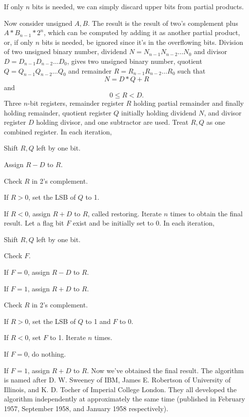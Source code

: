 \documentclass[a4paper,12pt]{report}
\begin{document}
If only $n$ bits is needed, we can simply discard upper bits from partial products.

Now consider unsigned $A,B$. The result is the result of two's complement plus $A*B_{n-1}*2^n$, which can be computed by adding it as another partial product, or, if only $n$ bits is needed, be ignored since it's in the overflowing bits.
Division of two unsigned binary number, dividend $N=N_{n-1}N_{n-2}\ldots N_0$ and divisor $D=D_{n-1}D_{n-2}\ldots D_0$, gives two unsigned binary number, quotient $Q=Q_{n-1}Q_{n-2}\ldots Q_0$ and remainder $R=R_{n-1}R_{n-2}\ldots R_0$ such that
\[N=D*Q+R\]
and
\[0\le R<D.\]
Three $n$-bit registers, remainder register $R$ holding partial remainder and finally holding remainder, quotient register $Q$ initially holding dividend $N$, and divisor register $D$ holding divisor, and one subtractor are used. Treat ${R,Q}$ as one combined register.
In each iteration,
\ben
\item Shift ${R,Q}$ left by one bit.
\item Assign $R-D$ to $R$.
\item Check $R$ in 2's complement.
\bit
\item If $R>0$, set the LSB of $Q$ to 1.
\item If $R<0$, assign $R+D$ to $R$, called restoring.
\eit
\een
Iterate $n$ times to obtain the final result.
Let a flag bit $F$ exist and be initially set to 0. In each iteration,
\ben
\item Shift ${R,Q}$ left by one bit.
\item Check $F$.
\bit
\item If $F=0$, assign $R-D$ to $R$.
\item If $F=1$, assign $R+D$ to $R$.
\eit
\item Check $R$ in 2's complement.
\bit
\item If $R>0$, set the LSB of $Q$ to 1 and $F$ to 0.
\item If $R<0$, set $F$ to 1.
\eit
\een
Iterate $n$ times.
\bit
\item If $F=0$, do nothing.
\item If $F=1$, assign $R+D$ to $R$.
\eit
Now we've obtained the final result.
The algorithm is named after D. W. Sweeney of IBM, James E. Robertson of University of Illinois, and K. D. Tocher of Imperial College London. They all developed the algorithm independently at approximately the same time (published in February 1957, September 1958, and January 1958 respectively).
\end{document}
